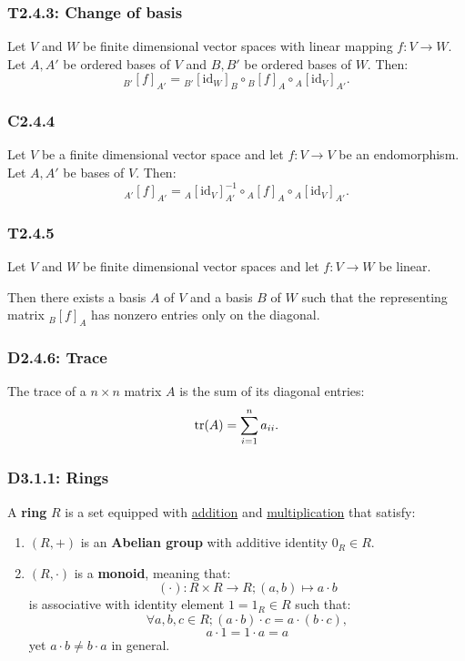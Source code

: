 \documentclass{article}
\begin{document}
\begin{multicols*}{3}
\subsubsection*{T2.4.3: Change of basis}
Let $V$ and $W$ be finite dimensional vector spaces
with linear mapping $f:V\rightarrow W$.
Let $A,A'$ be ordered bases of $V$ and
$B,B'$ be ordered bases of $W$. Then:
$${}_{B'}[f]_{A'}={}_{B'}[\text{id}_W]_{B}
\circ{}_{B}[f]_{A}\circ{}_{A}[\text{id}_V]_{A'}.$$

\subsubsection*{C2.4.4}
Let $V$ be a finite dimensional vector space and let
$f:V\rightarrow V$ be an endomorphism.
Let $A,A'$ be bases of $V$. Then:
$${}_{A'}[f]_{A'}={}_{A}[\text{id}_V]^{-1}_{A'}
\circ{}_{A}[f]_{A}\circ{}_{A}[\text{id}_V]_{A'}.$$

\subsubsection*{T2.4.5}
Let $V$ and $W$ be finite dimensional vector spaces and let
$f:V\rightarrow W$ be linear.

Then there exists a basis $A$ of $V$ and 
a basis $B$ of $W$ such that the representing matrix
${}_B[f]_A$ has nonzero entries only on the diagonal.

\subsubsection*{D2.4.6: Trace}
The trace of a $n\times n$ matrix $A$ is the sum of its diagonal
entries:
$$\tr(A)=\sum_{i=1}^{n}a_{ii}.$$

\subsubsection*{D3.1.1: Rings}
A \textbf{ring} $R$ is a set equipped with \underline{addition}
and \underline{multiplication} that satisfy:
\begin{enumerate}
    \item $(R,+)$ is an \textbf{Abelian group} with additive
    identity $0_R\in R$.
    
    \item $(R,\cdot)$ is a \textbf{monoid}, meaning that:
    $$(\cdot):R\times R\rightarrow R;(a,b)\mapsto a\cdot b$$
    is associative with identity element $1=1_R\in R$ such that:
    $$\forall a,b,c\in R;(a\cdot b)\cdot c
    =a\cdot(b\cdot c),$$
    $$a\cdot1=1\cdot a=a$$
    yet $a\cdot b\neq b\cdot a$ in general.


\end{enumerate}
\end{multicols*}
\end{document}
